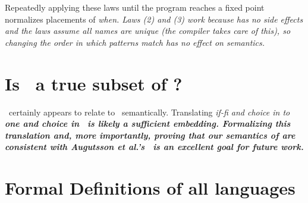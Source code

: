 \documentclass[manuscript,screen,review, 12pt, nonacm]{acmart}
\begin{document}
    Repeatedly applying these laws until the program reaches a fixed point
    normalizes placements of \it{when}. Laws (2) and (3) work because \PPlus
    has no side effects and the laws assume all names are unique (the compiler
    takes care of this), so changing the order in which patterns match has no
    effect on semantics.         

\section{Is \VMinus\ a true subset of \VC?}
\VMinus\ certainly appears to relate to \VC\ semantically. Translating
\it{if-fi} and choice in \VMinus to \bf{one} and choice in \VC\ is likely a
sufficient embedding. Formalizing this translation and, more importantly,
proving that our semantics of \VMinus are consistent with Augutsson et al.'s
\VC\ is an excellent goal for future work. 

\newcommand\dbar{▯}
\section{Formal Definitions of all languages}
\label{languagedefs}
\end{document}
